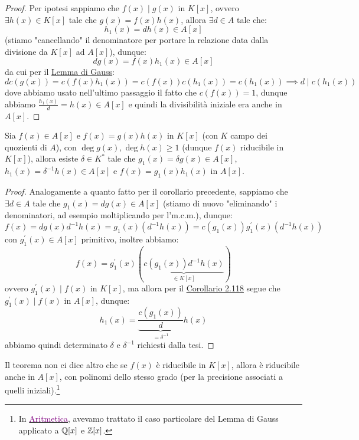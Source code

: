\documentclass[11pt]{scrartcl}
\begin{document}
\begin{proof}
    Per ipotesi sappiamo che $f(x) \mid g(x)$ in $K[x]$, ovvero $\exists h(x) \in K[x]$ tale che $g(x) = f(x)h(x)$, allora $\exists d \in A$ tale che:
    \[ h_1(x) = dh(x) \in A[x]
        \]
    (stiamo "cancellando" il denominatore per portare la relazione data dalla divisione da $K[x]$ ad $A[x]$), dunque:
    \[ dg(x) = f(x)h_1(x) \in A[x]
        \]
    da cui per il \hyperref[gauss]{Lemma di Gauss}:
    \[ dc(g(x)) = c(f(x)h_1(x)) = c(f(x))c(h_1(x)) = c(h_1(x)) \implies d \mid c(h_1(x))
        \]
    dove abbiamo usato nell'ultimo passaggio il fatto che $c(f(x)) = 1$, dunque abbiamo $\displaystyle\frac{h_1(x)}{d} = h(x) \in A[x]$
    e quindi la divisibilità iniziale era anche in $A[x]$. 
\end{proof}

\begin{corollary}
    \label{2.119}
    Sia $f(x) \in A[x]$ e $f(x) = g(x)h(x)$ in $K[x]$ (con $K$ campo dei quozienti di $A$), con $\deg g(x),\deg h(x) \geq 1$ (dunque $f(x)$ riducibile in $K[x]$),
    allora esiste $\delta \in K^*$ tale che $g_1(x) = \delta g(x) \in A[x]$, $h_1(x) = \delta^{-1}h(x) \in A[x]$ e $f(x) = g_1(x)h_1(x)$ in $A[x]$.
\end{corollary}

\begin{proof}
    Analogamente a quanto fatto per il corollario precedente, sappiamo che $\exists d \in A$ tale che $g_1(x) = dg(x) \in A[x]$ (stiamo di nuovo "eliminando" i denominatori, ad esempio moltiplicando per l'm.c.m.),
    dunque:
    \[ f(x) = dg(x)d^{-1}h(x) = g_1(x)(d^{-1}h(x)) = c(g_1(x))g_1^{\prime}(x)(d^{-1}h(x))
        \]
    con $g_1^{\prime}(x) \in A[x]$ primitivo, inoltre abbiamo:
    \[ f(x) = g_1^{\prime}(x)(\underbrace{c(g_1(x))d^{-1}h(x)}_{\in K[x]})
        \]
    ovvero $g_1^{\prime}(x) \mid f(x)$ in $K[x]$, ma allora per il \hyperref[2.118]{Corollario 2.118} segue che $g_1^{\prime}(x) \mid f(x)$ in $A[x]$, dunque:
    \[ h_1(x) = \underbrace{\frac{c(g_1(x))}{d}}_{= \delta^{-1}}h(x)
        \]
    abbiamo quindi determinato $\delta$ e $\delta^{-1}$ richiesti dalla tesi.
\end{proof}

\begin{remark}
    Il teorema non ci dice altro che se $f(x)$ è riducibile in $K[x]$, allora è riducibile anche in $A[x]$, con polinomi dello stesso grado (per la precisione associati a quelli iniziali).\footnote{In
    \href{https://github.com/diego-unipi/Appunti-Aritmetica}{\textcolor{purple}{Aritmetica}}, avevamo trattato il caso particolare del Lemma di Gauss applicato a $\mathbb Q[x]$ e $\mathbb Z[x]$.}
\end{remark}
\end{document}

